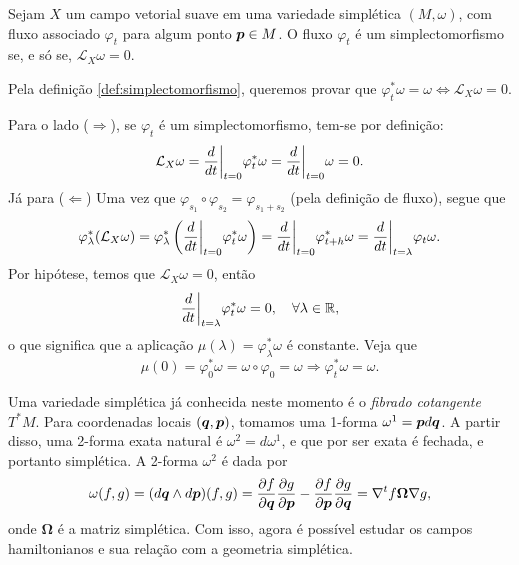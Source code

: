 \begin{theorem}\label{teorema:simplectomorfismo_e_lie}
    Sejam $X$ um campo vetorial suave em uma variedade simplética $(M, \omega)$, com fluxo associado $\varphi_t$ para algum ponto $\bm p \in M$. O fluxo $\varphi_t$ é um simplectomorfismo se, e só se, $\mathcal L_X \omega = 0$.
\end{theorem}
\begin{Proof}
    Pela definição \ref{def:simplectomorfismo}, queremos provar que $\varphi_t^* \omega = \omega \Leftrightarrow \mathcal L_X \omega = 0$.
    
    Para o lado ($\Rightarrow$), se $\varphi_t$ é um simplectomorfismo, tem-se por definição:
    \begin{equation*}
        \mathcal L_X \omega = \dfrac{d }{d t}\bigg\rvert_{t=0} \varphi_t^* \omega
        = \dfrac{d }{d t}\bigg\rvert_{t=0} \omega = 0.
    \end{equation*}
    Já para ($\Leftarrow$) Uma vez que $\varphi_{s_1} \circ \varphi_{s_2} = \varphi_{s_1 + s_2}$ (pela definição de fluxo), segue que
    \begin{equation*}
        \varphi_\lambda^* (\mathcal L_X \omega)
        = \varphi_\lambda^* \left(\dfrac{d }{d t}\bigg\rvert_{t=0} \varphi_t^* \omega\right) 
        = \dfrac{d }{d t}\bigg\rvert_{t=0} \varphi_{t+h}^* \omega
        = \dfrac{d }{d t}\bigg\rvert_{t=\lambda}\varphi_t \omega.
    \end{equation*}
    Por hipótese, temos que $\mathcal L_X \omega = 0$, então
    \begin{equation*}
        \dfrac{d }{d t}\bigg\rvert_{t=\lambda} \varphi_t^* \omega = 0, \quad \forall \lambda \in \mathbb{R},
    \end{equation*}
    o que significa que a aplicação $\mu(\lambda) = \varphi_\lambda^* \omega$ é constante. Veja que
    \begin{equation*}
        \mu(0) = \varphi_0^* \omega = \omega \circ \varphi_0 = \omega 
        \Rightarrow
        \varphi_t^* \omega = \omega.
    \end{equation*}
\end{Proof}

Uma variedade simplética já conhecida neste momento é o \textit{fibrado cotangente} $T^* M$. Para coordenadas locais $(\bm q, \bm p)$, tomamos uma 1-forma $\omega^1 = \bm p d \bm q$. A partir disso, uma 2-forma exata natural é $\omega^2 = d \omega^1$, e que por ser exata é fechada, e portanto simplética. A 2-forma $\omega^2$ é dada por
\begin{equation*}
    \omega(f,g) = (d \bm q \wedge d \bm p)(f,g) = \dfrac{\partial f}{\partial \bm q} \dfrac{\partial g}{\partial \bm p} - \dfrac{\partial f}{\partial \bm p} \dfrac{\partial g}{\partial \bm q} = \nabla^t f \bm \Omega \nabla g,
\end{equation*}
onde $\bm \Omega$ é a matriz simplética. Com isso, agora é possível estudar os campos hamiltonianos e sua relação com a geometria simplética.

